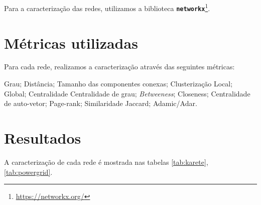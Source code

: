 \documentclass[12pt,a4paper]{article}
\begin{document}
	Para a caracterização das redes, utilizamos a biblioteca \texttt{\textbf{networkx}}\footnote{\url{https://networkx.org/}}.

	\section{Métricas utilizadas}
	
	Para cada rede, realizamos a caracterização através das seguintes métricas:
	
	\begin{outline}
	
	\1 Grau;
	\1 Distância;
	\1 Tamanho das componentes conexas;
	\1 Clusterização
		\2 Local;
		\2 Global;
	\1 Centralidade
		\2 Centralidade de grau;
		\2 \textit{Betweeness};
		\2 Closeness;
		\2 Centralidade de auto-vetor;
		\2 Page-rank;
	\1 Similaridade
		\2 Jaccard;
		\2 Adamic/Adar.
	
	\end{outline}

	
	\section{Resultados}
	
	A caracterização de cada rede é mostrada nas tabelas \ref{tab:karete}, \ref{tab:powergrid}.
	
\end{document}
